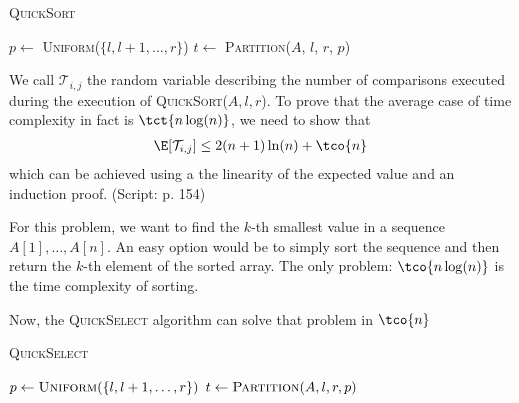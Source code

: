 \begin{algorithm}
    \caption{\textsc{QuickSort}}
    \begin{algorithmic}[1]
                \State $p \gets$ \textsc{Uniform}($\{l, l + 1, \ldots, r\}$) 
                \State $t \gets$ \textsc{Partition}($A$, $l$, $r$, $p$) 
                \State {} 
                \State {} 
            \EndIf
        \EndProcedure
    \end{algorithmic}
\end{algorithm}


\newcommand{\qsv}{\mathcal{T}_{i, j}}
We call $\qsv$ the random variable describing the number of comparisons executed during the execution of \textsc{QuickSort}($A, l, r$).
To prove that the average case of time complexity in fact is $\tct{n \log(n)}$, we need to show that
\begin{align*}
    \E[\qsv] \leq 2(n + 1) \ln(n) + \tco{n}
\end{align*}
which can be achieved using a the linearity of the expected value and an induction proof. (Script: p. 154)



For this problem, we want to find the $k$-th smallest value in a sequence $A[1], \ldots, A[n]$. An easy option would be to simply sort the sequence and then return the $k$-th element of the sorted array. The only problem: $\tco{n \log(n)}$ is the time complexity of sorting.

Now, the \textsc{QuickSelect} algorithm can solve that problem in $\tco{n}$
\begin{algorithm}
    \caption{\textsc{QuickSelect}}
    \begin{algorithmic}[1]
            \State $p \gets \textsc{Uniform}(\{l, l + 1, \ldots, r\})$ 
            \State $t \gets \textsc{Partition}(A, l, r, p)$
                \State {} 
                \State {} 
            \Else
                \State {} 
            \EndIf
        \EndProcedure
    \end{algorithmic}
\end{algorithm}



